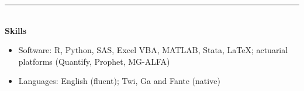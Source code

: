 \rule[4pt]{17cm}{0.3pt}\\
\medskip
{\large \bf Skills}
\medskip

\begin{itemize}
  \item Software: R, Python, SAS, Excel VBA, MATLAB, Stata, \LaTeX; actuarial platforms (Quantify, Prophet, MG-ALFA)
  \item Languages: English (fluent); Twi, Ga and Fante (native)
\end{itemize}
